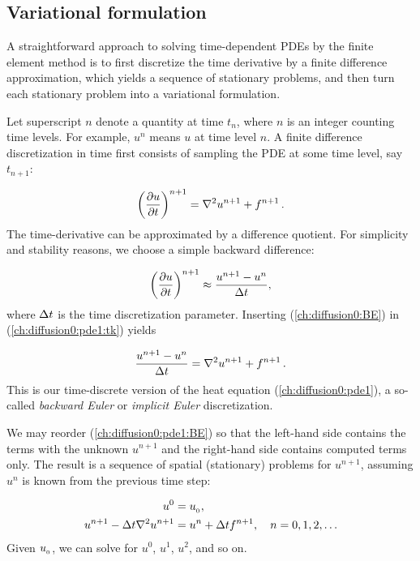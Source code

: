 \documentclass[graybox,envcountchap,sectrefs,final]{svmonodo}
\begin{document}
\subsection{Variational formulation}
\label{ftut:timedep:diffusion1}

A straightforward approach to solving time-dependent PDEs by the
finite element method is to first discretize the time derivative by a
finite difference approximation, which yields a sequence of
stationary problems, and then turn each stationary problem into a
variational formulation.

Let superscript $n$ denote a quantity at time $t_n$, where $n$ is an
integer counting time levels. For example, $u^n$ means $u$ at time
level $n$. A finite difference discretization in time first consists
of sampling the PDE at some time level, say $t_{n+1}$:


\begin{equation}
\left({\partial u \over\partial t}\right)^{n+1} = \nabla^2 u^{n+1} + f^{n+1}\thinspace .
\label{ch:diffusion0:pde1:tk}
\end{equation}
The time-derivative can be approximated by a difference quotient.
For simplicity and stability reasons, we choose a
simple backward difference:


\begin{equation}
\left({\partial u\over\partial t}\right)^{n+1}\approx {{u^{n+1} - u^n}\over{\Delta t}},
\label{ch:diffusion0:BE}
\end{equation}
where $\Delta t$ is the time discretization parameter.
Inserting (\ref{ch:diffusion0:BE}) in (\ref{ch:diffusion0:pde1:tk}) yields

\begin{equation}
{{u^{n+1} - u^n}\over{\Delta t}} = \nabla^2 u^{n+1} + f^{n+1}\thinspace .
\label{ch:diffusion0:pde1:BE}
\end{equation}
This is our time-discrete version of the heat equation
(\ref{ch:diffusion0:pde1}), a so-called \emph{backward Euler} or \emph{implicit
Euler} discretization.

We may reorder (\ref{ch:diffusion0:pde1:BE}) so
that the left-hand side contains the terms with the unknown $u^{n+1}$ and
the right-hand side contains computed terms only. The result
is a sequence of spatial (stationary) problems for $u^{n+1}$, assuming
$u^n$ is known from the previous time step:

\begin{align}
u^0 &= u_{_0}, \label{ch:diffusion0:pde1:u0}\\
u^{n+1} - {\Delta t}\nabla^2 u^{n+1} &=  u^n + {\Delta t} f^{n+1},\quad n=0,1,2,\ldots
\label{ch:diffusion0:pde1:uk}
\end{align}
Given $u_{_0}$, we can solve for $u^0$, $u^1$, $u^2$, and so on.
\end{document}
